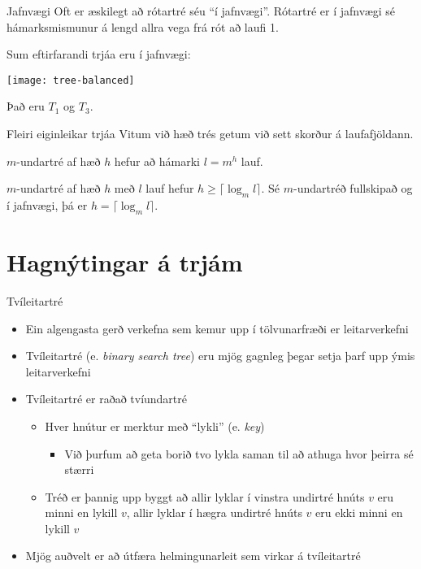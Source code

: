 \documentclass[handout]{beamer}
\begin{document}
\begin{frame}{Jafnvægi}
Oft er æskilegt að rótartré séu ``í jafnvægi''. Rótartré er í jafnvægi sé hámarksmismunur á lengd allra vega frá rót að laufi 1.

\vspace{0.5cm}
Sum eftirfarandi trjáa eru í jafnvægi:
\begin{center}
\texttt{[image: tree-balanced]}
\end{center}
\pause
Það eru $T_1$ og $T_3$.
\end{frame}

\begin{frame}{Fleiri eiginleikar trjáa}
Vitum við hæð trés getum við sett skorður á laufafjöldann.
\begin{tcolorbox}
$m$-undartré af hæð $h$ hefur að hámarki $l = m^h$ lauf.
\end{tcolorbox}

\begin{tcolorbox}
$m$-undartré af hæð $h$ með $l$ lauf hefur $h \geq \lceil \log_m l \rceil$. Sé $m$-undartréð fullskipað og í jafnvægi, þá er $h = \lceil \log_m l\rceil$.
\end{tcolorbox}
\end{frame}

\section{Hagnýtingar á trjám}

\begin{frame}{Tvíleitartré}
\begin{itemize}
 \item Ein algengasta gerð verkefna sem kemur upp í tölvunarfræði er leitarverkefni
 \item Tvíleitartré (e. \emph{binary search tree}) eru mjög gagnleg þegar setja þarf upp ýmis leitarverkefni
 \item Tvíleitartré er raðað tvíundartré
 \begin{itemize}
  \item Hver hnútur er merktur með ``lykli'' (e. \emph{key})
  \begin{itemize}
   \item Við þurfum að geta borið tvo lykla saman til að athuga hvor þeirra sé stærri
  \end{itemize}
  \item Tréð er þannig upp byggt að allir lyklar í vinstra undirtré hnúts $v$ eru minni en lykill $v$, allir lyklar í hægra undirtré hnúts $v$ eru ekki minni en lykill $v$
 \end{itemize}
 \item Mjög auðvelt er að útfæra helmingunarleit sem virkar á tvíleitartré
\end{itemize}
\end{frame}
\end{document}
